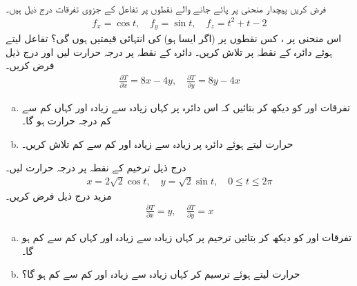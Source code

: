 \\
فرض کریں پیچدار منحنی  پر  پائے جانے والے نقطوں پر تفاعل   کے جزوی تفرقات درج ذیل ہیں۔
\begin{align*}
f_x=\cos t,\quad f_y=\sin t,\quad f_z=t^2+t-2
\end{align*}
اس منحنی پر ، کس نقطوں پر  (اگر ایسا ہو)   کی انتہائی  قیمتیں ہوں گی؟
تفاعل  لیتے ہوئے  دائرہ   کے  نقطہ  پر  تلاش کریں۔  
دائرہ  کے نقطہ   پر درجہ حرارت   لیں اور درج ذیل فرض کریں۔
\begin{align*}
\frac{\partial T}{\partial x}=8x-4y,\quad \frac{\partial T}{\partial y}=8y-4x
\end{align*}
\begin{enumerate}[a.]
\item
تفرقات  اور  کو دیکھ کر بتائیں کہ اس دائرہ پر کہاں زیادہ سے زیادہ اور کہاں کم سے کم درجہ حرارت ہو گا۔
\item
حرارت    لیتے ہوئے دائرہ پر زیادہ سے زیادہ اور کم سے کم  تلاش کریں۔
\end{enumerate}
درج ذیل ترخیم  کے نقطہ  پر درجہ حرارت  لیں۔
\begin{align*}
x=2\sqrt{2}\cos t,\quad y=\sqrt{2}\sin t,\quad 0\le t\le 2\pi
\end{align*}
مزید  درج ذیل فرض کریں۔
\begin{align*}
\frac{\partial T}{\partial x}=y,\quad \frac{\partial T}{\partial y}=x
\end{align*}
\begin{enumerate}[a.]
\item
تفرقات  اور  کو دیکھ کر بتائیں  ترخیم پر  کہاں زیادہ سے زیادہ  اور  کہاں کم سے کم     ہو گا۔
\item
حرارت  لیتے ہوئے ترسیم کر کہاں زیادہ سے زیادہ اور کم سے کم  ہو گا؟
\end{enumerate}
